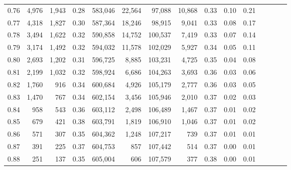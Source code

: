 \begin{tabular}{rrrcrrrrrrrrrrr}
0.76 &   4,976 &  1,943 &                                       0.28 &  583,046 &   22,564 &   97,088 &   10,868 &  0.33 &  0.10 &                         0.21 \\
0.77 &   4,318 &  1,827 &                                       0.30 &  587,364 &   18,246 &   98,915 &    9,041 &  0.33 &  0.08 &                         0.17 \\
0.78 &   3,494 &  1,622 &                                       0.32 &  590,858 &   14,752 &  100,537 &    7,419 &  0.33 &  0.07 &                         0.14 \\
0.79 &   3,174 &  1,492 &                                       0.32 &  594,032 &   11,578 &  102,029 &    5,927 &  0.34 &  0.05 &                         0.11 \\
0.80 &   2,693 &  1,202 &                                       0.31 &  596,725 &    8,885 &  103,231 &    4,725 &  0.35 &  0.04 &                         0.08 \\
0.81 &   2,199 &  1,032 &                                       0.32 &  598,924 &    6,686 &  104,263 &    3,693 &  0.36 &  0.03 &                         0.06 \\
0.82 &   1,760 &    916 &                                       0.34 &  600,684 &    4,926 &  105,179 &    2,777 &  0.36 &  0.03 &                         0.05 \\
0.83 &   1,470 &    767 &                                       0.34 &  602,154 &    3,456 &  105,946 &    2,010 &  0.37 &  0.02 &                         0.03 \\
0.84 &     958 &    543 &                                       0.36 &  603,112 &    2,498 &  106,489 &    1,467 &  0.37 &  0.01 &                         0.02 \\
0.85 &     679 &    421 &                                       0.38 &  603,791 &    1,819 &  106,910 &    1,046 &  0.37 &  0.01 &                         0.02 \\
0.86 &     571 &    307 &                                       0.35 &  604,362 &    1,248 &  107,217 &      739 &  0.37 &  0.01 &                         0.01 \\
0.87 &     391 &    225 &                                       0.37 &  604,753 &      857 &  107,442 &      514 &  0.37 &  0.00 &                         0.01 \\
0.88 &     251 &    137 &                                       0.35 &  605,004 &      606 &  107,579 &      377 &  0.38 &  0.00 &                         0.01 \\

\end{tabular}

